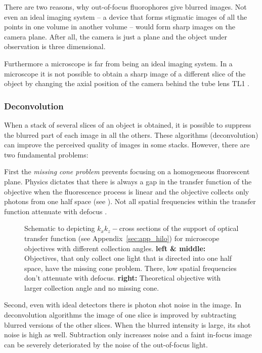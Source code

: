 There are two reasons, why out-of-focus fluorophores give blurred
images. Not even an ideal imaging system -- a device that forms
stigmatic images of all the points in one volume in another volume --
would form sharp images on the camera plane. After all, the camera is
just a plane and the object under observation is three dimensional.

Furthermore a microscope is far from being an ideal imaging system. In
a microscope it is not possible to obtain a sharp image of a different
slice of the object by changing the axial position of the camera
behind the tube lens TL1 \citep{Botcherby2007,Botcherby2008a}.
\subsubsection*{Deconvolution}
When a stack of several slices of an object is obtained, it is
possible to suppress the blurred part of each image in all the
others. These algorithms (deconvolution) can improve the perceived
quality of images in some stacks. However, there are two fundamental
problems:

First the \emph{missing cone problem} prevents focusing on a
homogeneous fluorescent plane. Physics dictates that there is always a
gap in the transfer function of the objective when the fluorescence
process is linear and the objective collects only photons from one
half space (see ). Not all spatial
frequencies within the transfer function attenuate with defocus
\citep{Neil1997}.

\begin{figure}[!hbt]
  \centering
  
  \caption{Schematic to depicting $k_xk_z-$cross sections of the
    support of optical transfer function (see
    Appendix~\ref{sec:app_hilo}) for microscope objectives with
    different collection angles. {\bf left \& middle:} Objectives,
    that only collect one light that is directed into one half space,
    have the missing cone problem. There, low spatial frequencies
    don't attenuate with defocus. {\bf right:} Theoretical objective
    with larger collection angle and no missing cone.}
  \label{fig:missing-cone}
\end{figure}

Second, even with ideal detectors there is photon shot noise in the
image. In deconvolution algorithms the image of one slice is improved
by subtracting blurred versions of the other slices. When the blurred
intensity is large, its shot noise is high as well. Subtraction only
increases noise and a faint in-focus image can be severely
deteriorated by the noise of the out-of-focus light.
